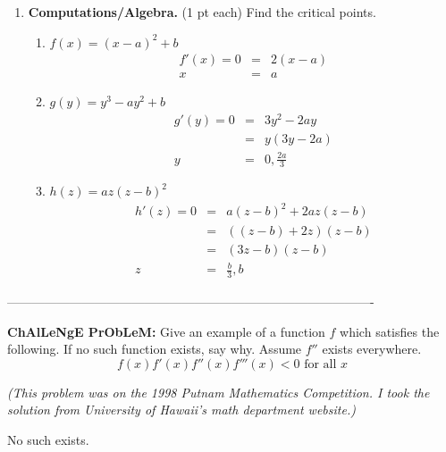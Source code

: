 \documentclass[11pt,letterpaper]{article}
\begin{document}
\begin{enumerate}
\pagebreak
\item \textbf{Computations/Algebra.} (1 pt each) Find the critical points.
\begin{enumerate}
\item $f(x)=(x-a)^2+b$
\begin{eqnarray*}
 f'(x)=0 &=& 2(x-a) \\
x &=& a 
\end{eqnarray*}

\vspace{.5pc}
\item $g(y)=y^3-ay^2+b$
\begin{eqnarray*}
 g'(y)=0 &=& 3y^2-2ay \\
&=& y(3y-2a) \\
y &=& 0,\frac{2a}{3} 
\end{eqnarray*}

\vspace{.5pc}
\item $h(z)=az(z-b)^2$
\begin{eqnarray*}
 h'(z)=0 &=& a(z-b)^2+2az(z-b) \\
&=& ((z-b)+2z)(z-b) \\
&=& (3z-b)(z-b) \\
z &=& \frac{b}{3},b 
\end{eqnarray*}

\vspace{1pc}
\end{enumerate}

\end{enumerate}
----------------------------------------------------------------------------------------

\vspace{1pc}
\noindent \textbf{ChAlLeNgE PrObLeM:}  Give an example of a function $f$ which satisfies the following.  If no such function exists, say why.  Assume $f''$ exists everywhere.  
\[f(x)f'(x)f''(x)f'''(x)<0 \text{ for all }x\]

\vspace{.5pc}
 \emph{(This problem was on the 1998 Putnam Mathematics Competition.  I took the solution from University of Hawaii's math department website.)}  

\vspace{.5pc}
No such exists.
\end{document}
